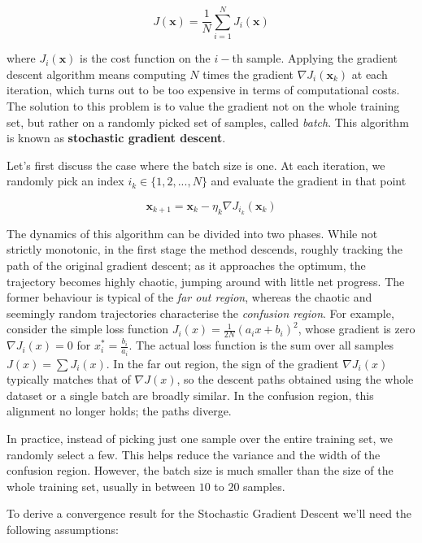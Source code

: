 \documentclass{article}
\numberwithin{equation}{subsection}
\begin{document}
\begin{equation*}
    J(\textbf{x}) = \frac{1}{N} \sum_{i=1}^N J_i(\textbf{x})
\end{equation*}

where $J_i(\textbf{x})$ is the cost function on the $i-$th sample. Applying the gradient descent algorithm means computing $N$ times the gradient $\nabla J_i(\textbf{x}_k)$ at each iteration, which turns out to be too expensive in terms of computational costs. The solution to this problem is to value the gradient not on the whole training set, but rather on a randomly picked set of samples, called \textit{batch}. This algorithm is known as \textbf{stochastic gradient descent}.

Let's first discuss the case where the batch size is one. At each iteration, we randomly pick an index $i_k \in \{1,2,...,N\}$ and evaluate the gradient in that point

\begin{equation*}
    \textbf{x}_{k+1} = \textbf{x}_k - \eta_k \nabla J_{i_k}(\textbf{x}_k)
\end{equation*}

The dynamics of this algorithm can be divided into two phases. While not strictly monotonic, in the first stage the method descends, roughly tracking the path of the original gradient descent; as it approaches the optimum, the trajectory becomes highly chaotic, jumping around with little net progress. The former behaviour is typical of the \textit{far out region}, whereas the chaotic and seemingly random trajectories characterise the \textit{confusion region}. For example, consider the simple loss function $J_i(x) = \frac{1}{2N}(a_i x + b_i)^2$, whose gradient is zero $\nabla J_i(x) = 0$ for $x^*_i = \frac{b_i}{a_i}$. The actual loss function is the sum over all samples $J(x) = \sum J_i(x)$. In the far out region, the sign of the gradient $\nabla J_i(x)$ typically matches that of $\nabla J(x)$, so the descent paths obtained using the whole dataset or a single batch are broadly similar. In the confusion region, this alignment no longer holds; the paths diverge.

In practice, instead of picking just one sample over the entire training set, we randomly select a few. This helps reduce the variance and the width of the confusion region. However, the batch size is much smaller than the size of the whole training set, usually in between $10$ to $20$ samples.

To derive a convergence result for the Stochastic Gradient Descent we'll need the following assumptions:
\end{document}
